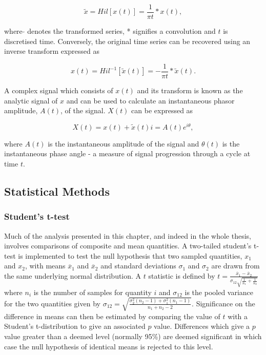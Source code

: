 \begin{equation} \label{eq:hilbert1}
\tilde{x} = Hil[x(t)] = \frac{1}{\pi t} * x(t),
\end{equation}

where $\tilde{}$ denotes the transformed series, * signifies a convolution and $t$ is discretised time. Conversely, the original time series can be recovered using an inverse transform expressed as

\begin{equation} \label{eq:hilbert2}
{x(t)} = Hil^{-1}[\tilde{x}(t)] = -\frac{1}{\pi t} * \tilde{x}(t).
\end{equation}

A complex signal which consists of $x(t)$ and its transform is known as the analytic signal of $x$ and can be used to calculate an instantaneous phasor amplitude, $A(t)$, of the signal. $X(t)$ can be expressed as

\begin{equation} \label{eq:hilbert3}
X(t) = x(t) + \tilde{x}(t) i = A(t) e^{i\theta},
\end{equation}

where $A(t)$ is the instantaneous amplitude of the signal and $\theta(t)$ is the instantaneous phase angle - a measure of signal progression through a cycle at time $t$.

\subsection{Statistical Methods}
\label{sec:stat_tests}

\subsubsection*{Student's t-test}
Much of the analysis presented in this chapter, and indeed in the whole thesis, involves comparisons of composite and mean quantities. A two-tailed student's t-test is implemented to test the null hypothesis that two sampled quantities, $x_1$ and $x_2$, with means $\overline{x}_1$ and $\overline{x}_2$ and standard deviations $\sigma_{1}$ and $\sigma_{2}$ are drawn from the same underlying normal distribution. A $t$ statistic is defined by $t = \frac{\overline{x}_1 - \overline{x}_2}{\sigma_{12} \sqrt{\frac{1}{n_1} + \frac{1}{n_2}}}$ where $n_i$ is the number of samples for quantity $i$ and $\sigma_{12}$ is the pooled variance for the two quantities given by $\sigma_{12} = \sqrt{\frac{\sigma^2_2 (n_2-1) + \sigma^2_1(n_1 - 1)}{n_1+n_2-2}}$. Significance on the difference in means can then be estimated by comparing the value of $t$ with a Student's t-distribution to give an associated $p$ value. Differences which give a $p$ value greater than a deemed level (normally 95\%) are deemed significant in which case the null hypothesis of identical means is rejected to this level.

